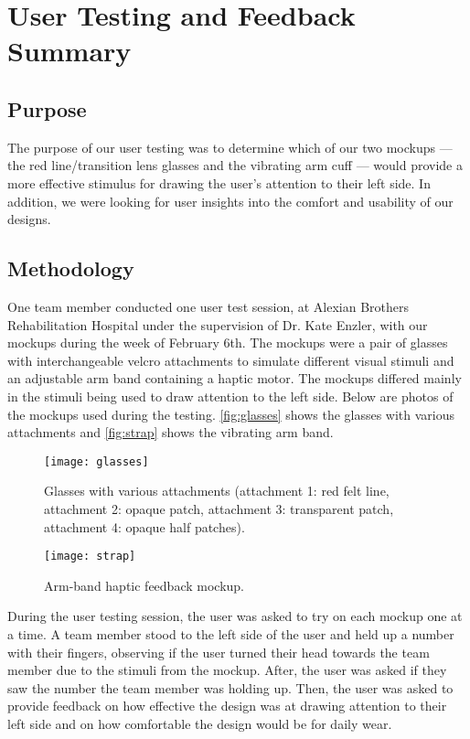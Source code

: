 \chapter{User Testing and Feedback Summary}
\label{chap:feedback}

\section{Purpose}

The purpose of our user testing was to determine which of our two mockups ---
the red line/transition lens glasses and the vibrating arm cuff --- would
provide a more effective stimulus for drawing the user’s attention to their
left side. In addition, we were looking for user insights into the comfort and
usability of our designs.

\section{Methodology}

One team member conducted one user test session, at Alexian Brothers
Rehabilitation Hospital under the supervision of Dr. Kate Enzler, with our
mockups during the week of February 6th. The mockups were a pair of glasses
with interchangeable velcro attachments to simulate different visual stimuli
and an adjustable arm band containing a haptic motor. The mockups differed
mainly in the stimuli being used to draw attention to the left side. Below are
photos of the mockups used during the testing. \autoref{fig:glasses} shows the
glasses with various attachments and \autoref{fig:strap} shows the vibrating
arm band.

\begin{figure}[h]
  \centering
  \texttt{[image: glasses]}
  \caption[Design 1: Glasses and Attachments]{Glasses with various attachments
    (attachment 1: red felt line, attachment 2: opaque patch, attachment 3:
    transparent patch, attachment 4: opaque half patches).}
  \label{fig:glasses}
\end{figure}

\begin{figure}[h]
  \centering
  \texttt{[image: strap]}
  \caption[Design 2: Arm-band]{Arm-band haptic feedback mockup.}
  \label{fig:strap}
\end{figure}

During the user testing session, the user was asked to try on each mockup one
at a time.  A team member stood to the left side of the user and held up a
number with their fingers, observing if the user turned their head towards the
team member due to the stimuli from the mockup. After, the user was asked if
they saw the number the team member was holding up. Then, the user was asked to
provide feedback on how effective the design was at drawing attention to their
left side and on how comfortable the design would be for daily wear.

